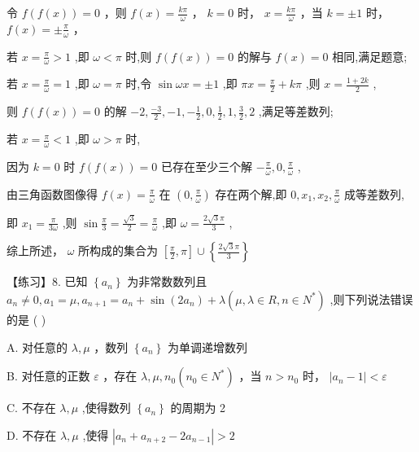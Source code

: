 \documentclass[10pt]{article}
\newcommand*\circled[1]{\tikz[baseline=(char.base)]{\node[shape=circle,draw,inner sep=1.5pt] (char) {\small #1};}}
\begin{document}
 \circled{2}  令 \(f\left( {f\left( x\right) }\right)  = 0\) ，则 \(f\left( x\right)  = \frac{k\pi }{\omega }\) ， \(k = 0\) 时， \(x = \frac{k\pi }{\omega }\) ，当 \(k =  \pm  1\) 时， \(f\left( x\right)  =  \pm  \frac{\pi }{\omega }\) ，

若 \(x = \frac{\pi }{\omega } > 1\) ,即 \(\omega  < \pi\) 时,则 \(f\left( {f\left( x\right) }\right)  = 0\) 的解与 \(f\left( x\right)  = 0\) 相同,满足题意;

若 \(x = \frac{\pi }{\omega } = 1\) ,即 \(\omega  = \pi\) 时,令 \(\sin {\omega x} =  \pm  1\) ,即 \({\pi x} = \frac{\pi }{2} + {k\pi }\) ,则 \(x = \frac{1 + {2k}}{2}\) ,

则 \(f\left( {f\left( x\right) }\right)  = 0\) 的解 \(- 2,\frac{-3}{2}, - 1, - \frac{1}{2},0,\frac{1}{2},1,\frac{3}{2},2\) ,满足等差数列;

若 \(x = \frac{\pi }{\omega } < 1\) ,即 \(\omega  > \pi\) 时,

因为 \(k = 0\) 时 \(f\left( {f\left( x\right) }\right)  = 0\) 已存在至少三个解 \(- \frac{\pi }{\omega },0,\frac{\pi }{\omega }\) ,

由三角函数图像得 \(f\left( x\right)  = \frac{\pi }{\omega }\) 在 \(\left( {0,\frac{\pi }{\omega }}\right)\) 存在两个解,即 \(0,{x}_{1},{x}_{2},\frac{\pi }{\omega }\) 成等差数列,

即 \({x}_{1} = \frac{\pi }{3\omega }\) ,则 \(\sin \frac{\pi }{3} = \frac{\sqrt{3}}{2} = \frac{\pi }{\omega }\) ,即 \(\omega  = \frac{2\sqrt{3}\pi }{3}\) ,

综上所述， \(\omega\) 所构成的集合为 \(\left\lbrack  {\frac{\pi }{2},\pi }\right\rbrack   \cup  \left\{  \frac{2\sqrt{3}\pi }{3}\right\}\)

【练习】8. 已知 \(\left\{  {a}_{n}\right\}\) 为非常数数列且 \({a}_{n} \neq  0,{a}_{1} = \mu ,{a}_{n + 1} = {a}_{n} + \sin \left( {2{a}_{n}}\right)  + \lambda \left( {\mu ,\lambda  \in  R,n \in  {N}^{ * }}\right)\) ,则下列说法错误的是 ( )

A. 对任意的 \(\lambda ,\mu\) ，数列 \(\left\{  {a}_{n}\right\}\) 为单调递增数列

B. 对任意的正数 \(\varepsilon\) ，存在 \(\lambda ,\mu ,{n}_{0}\left( {{n}_{0} \in  {N}^{ * }}\right)\) ，当 \(n > {n}_{0}\) 时， \(\left| {{a}_{n} - 1}\right|  < \varepsilon\)

C. 不存在 \(\lambda ,\mu\) ,使得数列 \(\left\{  {a}_{n}\right\}\) 的周期为 2

D. 不存在 \(\lambda ,\mu\) ,使得 \(\left| {{a}_{n} + {a}_{n + 2} - 2{a}_{n - 1}}\right|  > 2\)
\end{document}
